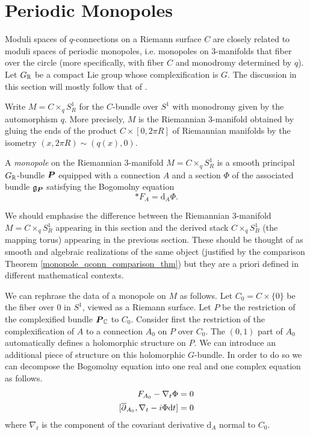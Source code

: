 \documentclass[10pt, oneside]{article}
\renewcommand{\d}{\mathrm{d}}
\begin{document}

\section{Periodic Monopoles}
Moduli spaces of $q$-connections on a Riemann surface $C$ are closely related to moduli spaces of periodic monopoles, i.e. monopoles on 3-manifolds that fiber over the circle (more specifically, with fiber $C$ and monodromy determined by $q$).  Let $G_{\mathbb{R}}$ be a compact Lie group whose complexification is $G$.  The discussion in this section will mostly follow that of \cite{CharbonneauHurtubise, Smith}.

Write $M = C\times_q S^1_R$ for the $C$-bundle over $S^1$ with monodromy given by the automorphism $q$.  More precisely, $M$ is the Riemannian 3-manifold obtained by gluing the ends of the product $C \times [0,2\pi R]$ of Riemannian manifolds by the isometry $(x,2\pi R) \sim (q(x), 0)$.

\begin{definition}
A \emph{monopole} on the Riemannian 3-manifold $M = C \times_q S^1_R$ is a smooth principal $G_{\mathbb{R}}$-bundle $\boldsymbol{P}$ equipped with a connection $A$ and a section $\Phi$ of the associated bundle $\mathfrak{g}_{\boldsymbol{P}}$ satisfying the Bogomolny equation 
\[\ast F_A = \d_A \Phi.\]
\end{definition}

\begin{remark}
We should emphasise the difference between the Riemannian 3-manifold $M = C \times_q S^1_R$ appearing in this section and the derived stack $C \times_q S^1_B$ (the mapping torus) appearing in the previous section.  These should be thought of as smooth and algebraic realizations of the same object (justified by the comparison Theorem \ref{monopole_qconn_comparison_thm}) but they are a priori defined in different mathematical contexts.
\end{remark}

We can rephrase the data of a monopole on $M$ as follows.  Let $C_0 = C \times \{0\}$ be the fiber over $0$ in $S^1$, viewed as a Riemann surface.  Let $P$ be the restriction of the complexified bundle $\boldsymbol{P}_{\mathbb{C}}$ to $C_0$.  Consider first the restriction of the complexification of $A$ to a connection $A_0$ on $P$ over $C_0$.  The $(0,1)$ part of $A_0$ automatically defines a holomorphic structure on $P$.  We can introduce an additional piece of structure on this holomorphic $G$-bundle.  In order to do so we can decompose the Bogomolny equation into one real and one complex equation as follows.
\begin{align*}
F_{A_0} - \nabla_t \Phi &= 0 \\
[\ol{\del}_{A_0}, \nabla_t - i\Phi \d t] &= 0 
\end{align*}
where $\nabla_t$ is the component of the covariant derivative $\d_A$ normal to $C_0$.  
\end{document}
